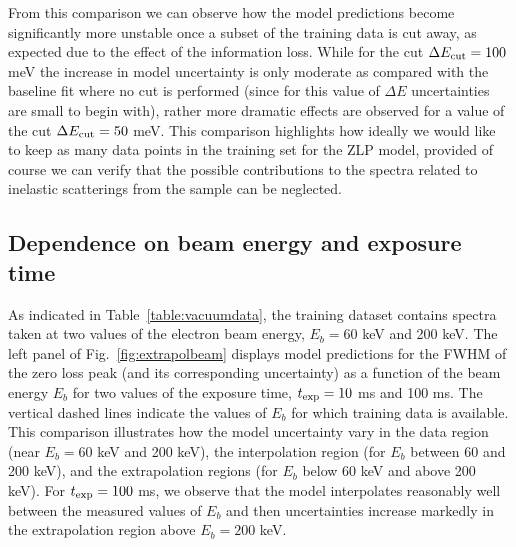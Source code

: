 From this comparison we can observe how the model predictions become significantly more unstable
once a subset of the training data is cut away, as expected due to the effect of the information
loss.
%
While for the cut $\Delta E_{\rm cut}=100$ meV the increase in model uncertainty is only moderate
as compared with the baseline fit where no cut is performed (since for this value of $\Delta E$
uncertainties are small to begin with), rather more dramatic effects are observed
for a value of the cut $\Delta E_{\rm cut}=50$ meV.
%
This comparison highlights how ideally we would like to keep as many data points
in the training set for the ZLP model, provided of course we can verify that the
possible contributions to the spectra related to inelastic scatterings from the
sample can be neglected.

\subsection{Dependence on beam energy and exposure time }
\label{sec:depebeam}

As indicated in Table~\ref{table:vacuumdata}, the training dataset contains
spectra taken at two values of the electron beam energy, $E_b=60$ keV and 200 keV.
%
The left panel of Fig.~\ref{fig:extrapolbeam} displays  model predictions for the FWHM of the zero loss peak
      (and its corresponding uncertainty) as a function of the beam energy $E_b$
      for two values of the exposure time, $t_{\rm exp}=10$ ms and 100 ms.
      The vertical dashed lines indicate the values of $E_b$ for which training data is available.
      This comparison illustrates how the model uncertainty vary in the data region
      (near $E_b=60$ keV and 200 keV), the interpolation region (for $E_b$ between 60 and 200 keV),
      and the extrapolation regions (for $E_b$ below 60 keV and above 200 keV).
      For $t_{\rm exp}=100$ ms, we observe that the model interpolates reasonably well
      between the measured values of $E_b$ and then uncertainties increase
      markedly in the extrapolation region above $E_b=200$ keV.
      
